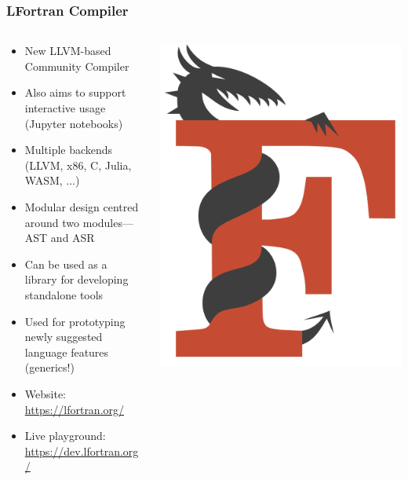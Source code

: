 \documentclass[aspectratio=169]{beamer}
\begin{document}
\begin{frame}
\frametitle{LFortran Compiler}
\begin{columns}[T] %
\begin{column}{.78\textwidth}
{\footnotesize
\begin{itemize}
\item New LLVM-based Community Compiler
\item Also aims to support interactive usage (Jupyter notebooks)
\item Multiple backends (LLVM, x86, C, Julia, WASM, ...)
\item Modular design centred around two modules---AST and ASR
\item Can be used as a library for developing standalone tools
\item Used for prototyping newly suggested language features (generics!)
\end{itemize}}
\begin{itemize}
    \item Website: \url{https://lfortran.org/}
    \item Live playground: \url{https://dev.lfortran.org/}
\end{itemize}
\end{column}%
\hfill%
\begin{column}{.18\textwidth}
    \centering
    \includegraphics[width=\textwidth]{lfortran_screenshot}
\end{column}%
\end{columns}

\end{frame}
\end{document}
